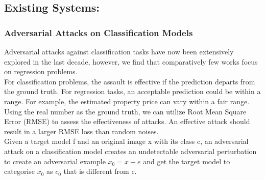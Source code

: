 \documentclass[ 12pt,a4paper,twocolumn,fleqn]{article}
\begin{document}
\subsection{Existing Systems:}
\subsubsection{Adversarial Attacks on Classification Models}
Adversarial attacks against classification tasks have now been extensively explored in the last decade, however, we find that comparatively few works focus on regression problems.\\
%
For classification problems, the assault is effective if the prediction departs from the ground truth. For regression tasks, an acceptable prediction could be within a range. For example, the estimated property price can vary within a fair range. Using the real number as the ground truth, we can utilize Root Mean Square Error (RMSE) to assess the effectiveness of attacks. An effective attack should result in a larger RMSE loss than random noises.\\
Given a target model f and an original image x with its class c, an adversarial attack on a classification model creates an undetectable adversarial perturbation to create an adversarial example $x_{0} = x + e$ and get the target model to categorise  $x_{0}$ as $c_{0}$ that is different from c.
\end{document}
